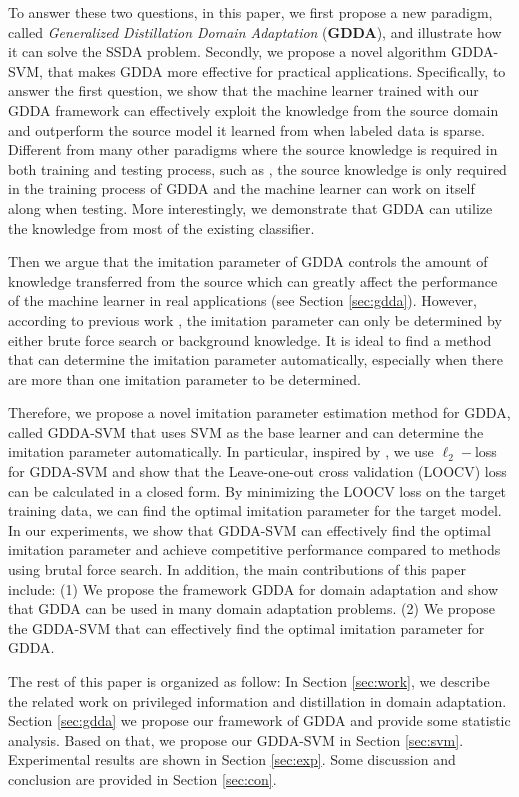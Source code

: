 To answer these two questions, in this paper, we first propose a new paradigm, called \textit{Generalized Distillation Domain Adaptation} (\textbf{GDDA}), and illustrate how it can solve the SSDA problem. Secondly, we propose a novel algorithm GDDA-SVM, that makes GDDA more effective for practical applications. Specifically, to answer the first question, we show that the machine learner trained with our GDDA framework can effectively exploit the knowledge from the source domain and outperform the source model it learned from when labeled data is sparse.
Different from many other paradigms where the source knowledge is required in both training and testing process, such as \cite{kuzborskij2013stability}, the source knowledge is only required in the training process of GDDA and the machine learner can work on itself along when testing. More interestingly, we demonstrate that GDDA can utilize the knowledge from most of the existing classifier.

Then we argue that the imitation parameter of GDDA controls the amount of knowledge transferred from the source which can greatly affect the performance of the machine learner in real applications (see Section \ref{sec:gdda}).
However, according to previous work \cite{lopez2015unifying,Tzeng_2015_ICCV}, the imitation parameter can only be determined by either brute force search or background knowledge. It is ideal to find a method that can determine the imitation parameter automatically, especially when there are more than one imitation parameter to be determined.

Therefore, we propose a novel imitation parameter estimation method for GDDA, called GDDA-SVM that uses SVM as the base learner and can determine the imitation parameter automatically. In particular, inspired by \cite{cawley2006leave}, we use $\ell_2-$loss for GDDA-SVM and show that the Leave-one-out cross validation (LOOCV) loss can be calculated in a closed form. By minimizing the LOOCV loss on the target training data, we can find the optimal imitation parameter for the target model. In our experiments, we show that GDDA-SVM can effectively find the optimal imitation parameter and achieve competitive performance compared to methods using brutal force search. In addition, the main contributions of this paper include: (1) We propose the framework GDDA for domain adaptation and show that GDDA can be used in many domain adaptation problems. (2) We propose the GDDA-SVM that can effectively find the optimal imitation parameter for GDDA.

The rest of this paper is organized as follow: In Section \ref{sec:work}, we describe the related work on privileged information and distillation in domain adaptation. Section \ref{sec:gdda} we propose our framework of GDDA and provide some statistic analysis. Based on that, we propose our GDDA-SVM in Section \ref{sec:svm}. Experimental results are shown in Section \ref{sec:exp}. Some discussion and conclusion are provided in Section \ref{sec:con}.